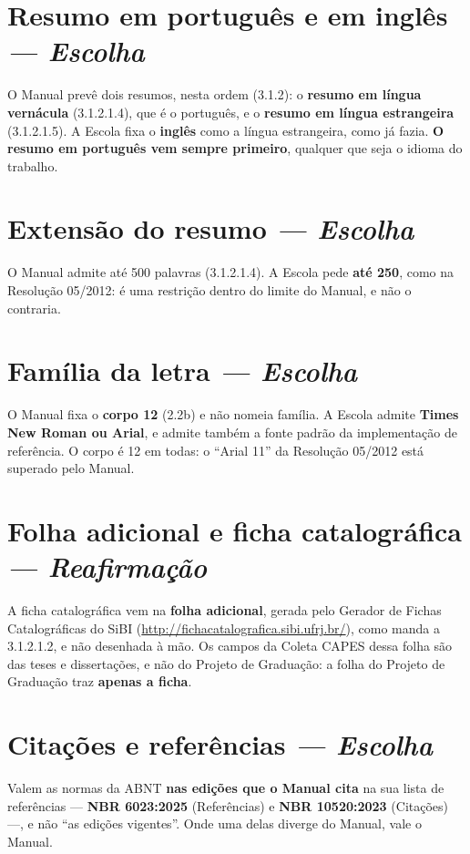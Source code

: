 \documentclass[a4paper,11pt]{article}
\newcommand\tipo[1]{\normalfont\textit{--- #1}}
\begin{document}
\section{Resumo em português e em inglês \tipo{Escolha}}

O Manual prevê dois resumos, nesta ordem (3.1.2): o \textbf{resumo em língua
vernácula} (3.1.2.1.4), que é o português, e o \textbf{resumo em língua
estrangeira} (3.1.2.1.5). A Escola fixa o \textbf{inglês} como a língua
estrangeira, como já fazia. \textbf{O resumo em português vem sempre primeiro},
qualquer que seja o idioma do trabalho.

\section{Extensão do resumo \tipo{Escolha}}

O Manual admite até 500 palavras (3.1.2.1.4). A Escola pede \textbf{até 250},
como na Resolução 05/2012: é uma restrição dentro do limite do Manual, e não o
contraria.

\section{Família da letra \tipo{Escolha}}

O Manual fixa o \textbf{corpo 12} (2.2b) e não nomeia família. A Escola admite
\textbf{Times New Roman ou Arial}, e admite também a fonte padrão da
implementação de referência. O corpo é 12 em todas: o ``Arial 11'' da Resolução
05/2012 está superado pelo Manual.

\section{Folha adicional e ficha catalográfica \tipo{Reafirmação}}

A ficha catalográfica vem na \textbf{folha adicional}, gerada pelo Gerador de
Fichas Catalográficas do SiBI (\url{http://fichacatalografica.sibi.ufrj.br/}),
como manda a 3.1.2.1.2, e não desenhada à mão. Os campos da Coleta CAPES dessa
folha são das teses e dissertações, e não do Projeto de Graduação: a folha do
Projeto de Graduação traz \textbf{apenas a ficha}.

\section{Citações e referências \tipo{Escolha}}
\label{norma:citacoes}

Valem as normas da ABNT \textbf{nas edições que o Manual cita} na sua lista de
referências --- \textbf{NBR 6023:2025} (Referências) e \textbf{NBR 10520:2023}
(Citações) ---, e não ``as edições vigentes''. Onde uma delas diverge do
Manual, vale o Manual.
\end{document}
